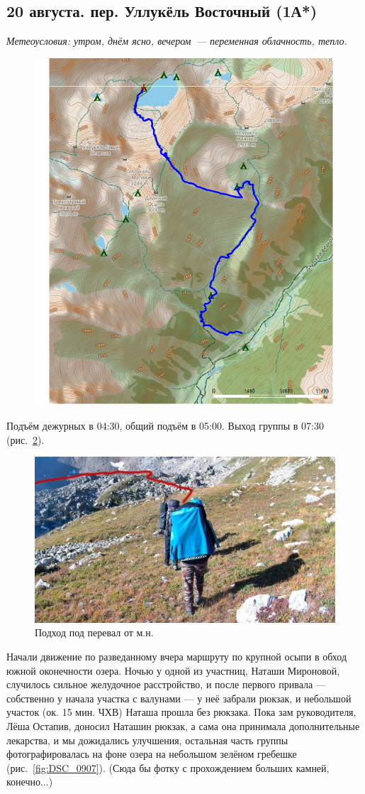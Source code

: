 \subsection{20 августа. пер. Уллукёль Восточный (1А*)}
\textit{Метеоусловия: утром, днём ясно, вечером~--- переменная облачность, тепло.}

\begin{figure}[h!]
	\centering
	\includegraphics[angle=0, width=0.7\linewidth]{../pics/mini_maps/20}
	\label{fig:mini_20}
\end{figure}

Подъём дежурных в 04:30, общий подъём в 05:00. Выход группы в 07:30 (рис.~\ref{fig:20aug1.jpg}).

\begin{figure}[h!]
	\centering
	\includegraphics[width=0.7\linewidth]{../pics/20aug1.jpg}
	\caption{Подход под перевал от м.н.}
	\label{fig:20aug1.jpg}
\end{figure}


Начали движение по разведанному вчера маршруту по крупной осыпи в обход южной оконечности озера. Ночью у одной из участниц, Наташи Мироновой, случилось сильное желудочное расстройство, и после первого  привала --- собственно у начала участка с валунами --- у неё забрали рюкзак, и небольшой участок (ок. 15 мин. ЧХВ) Наташа прошла без рюкзака. Пока зам руководителя, Лёша Остапив, доносил Наташин рюкзак, а сама она принимала дополнительные лекарства, и мы дожидались улучшения, остальная часть группы фотографировалась на фоне озера на небольшом зелёном гребешке (рис.~\ref{fig:DSC_0907}). \alert{(Сюда бы фотку с прохождением больших камней, конечно...)} 

